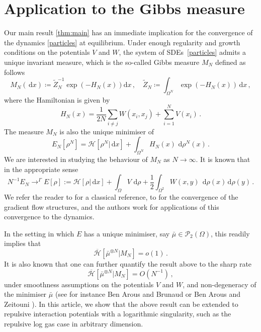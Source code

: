 \documentclass[a4paper,10pt,twoside]{amsart}
\newcommand{\dx}[1]{\,\mathrm{d}#1}  %
\theoremstyle{remark}
\theoremstyle{definition}
\numberwithin{equation}{section}
\newcommand{\cP}{\mathcal{P}}
\newcommand{\0}{{\bf 0}}
\newcommand{\+}{\hspace{-.5ex}+\hspace{-.5ex}}
\begin{document}
\section{Application to the Gibbs measure} %
\label{sub:gibbs_measure_and_convergence}
Our main result \cref{thm:main} has an immediate implication for the convergence of the dynamics \eqref{particles} at equilibrium. Under enough regularity and growth conditions on the potentials $V$ and $W$, the system of SDEs~\eqref{particles} admits a unique invariant measure, which is the so-called Gibbs measure $M_N$ defined as follows
\begin{equation}
  \label{eq:Gibbs}
  M_N(\dx{x}) \coloneqq \tilde{Z}_N^{-1} \exp \left(-H_N(x)\right) \mathrm{d}x\,, \quad \tilde{Z}_N\coloneqq \int_{\Omega^N} \exp \left(-H_N(x)\right)\dx{x} \, ,
\end{equation}
where the Hamiltonian is given by
$$
H_N(x)=\frac{1}{2N}\sum_{i\ne j}W(x_i,x_j) + \sum_{i=1}^N V(x_i) \, .
$$
The measure $M_N$ is also the unique minimiser of 
$$
E_N[\rho^N]=\mathcal{H}[\rho^N|\dx{x}] + \int_{\Omega^N}  H_N(x)\, \dx{\rho^N}(x) \, .
$$
We are interested in studying the behaviour of $M_N$ as $N \to \infty$. It is known that in the appropriate sense 
$$
N^{-1}E_N\to^\Gamma E[\rho]:=\mathcal{H}[\rho|\dx{x}] + \int_{\Omega} V \, \dx{\rho} + \frac{1}{2}\int_{\Omega^2} W(x,y)\;\dx\rho(x)\dx\rho(y) \, .
$$ 
We refer the reader to \cite{messer1982statistical} for a classical reference, to \cite{CARRILLO2020108734} for the convergence of the gradient flow structures, and the authors work \cite{Delgadino2021,Delgadino2023} for applications of this convergence to the dynamics. 

In the setting in which $E$ has a unique minimiser, say $\bar \mu \in \cP_2(\Omega)$, this readily implies that 
\begin{equation}
  \overline{\mathcal{H}}[\bar\mu^{\otimes N}|M_N] =o(1) \, . 
\end{equation}
It is also known that one can further quantify the result above to the sharp rate 
\begin{equation}
  \overline{\mathcal{H}}[\bar\mu^{\otimes N}|M_N] =O(N^{-1}) \, ,
  \label{eq:sharprate}
\end{equation}
under smoothness assumptions on the potentials $V$ and $W$, and non-degeneracy of the minimiser $\bar \mu$ (see for instance Ben Arous and Brunaud \cite{BenArous1990} or Ben Arous and Zeitouni \cite{BenArous1999}). In this article, we show that the above result can be extended to repulsive interaction potentials with a logarithmic singularity, such as the repulsive log gas case in arbitrary dimension.
\end{document}
